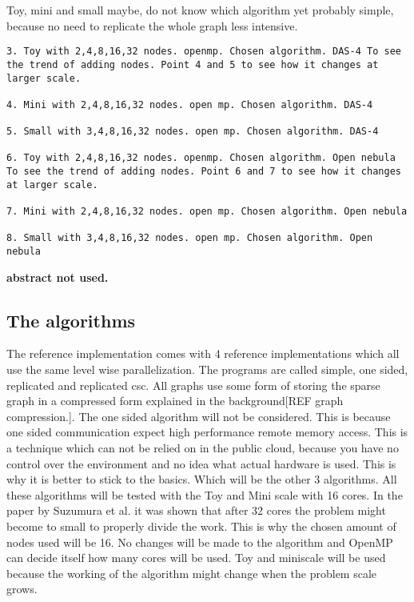 Toy, mini and small maybe, do not know which algorithm yet probably simple, because no need to replicate the whole graph less intensive.
\begin{lstlisting}
3. Toy with 2,4,8,16,32 nodes. openmp. Chosen algorithm. DAS-4 To see the trend of adding nodes. Point 4 and 5 to see how it changes at larger scale.

4. Mini with 2,4,8,16,32 nodes. open mp. Chosen algorithm. DAS-4

5. Small with 3,4,8,16,32 nodes. open mp. Chosen algorithm. DAS-4

6. Toy with 2,4,8,16,32 nodes. openmp. Chosen algorithm. Open nebula To see the trend of adding nodes. Point 6 and 7 to see how it changes at larger scale.

7. Mini with 2,4,8,16,32 nodes. open mp. Chosen algorithm. Open nebula

8. Small with 3,4,8,16,32 nodes. open mp. Chosen algorithm. Open nebula
\end{lstlisting}



\textbf{abstract not used.}

\subsection{The algorithms}
The reference implementation comes with 4 reference implementations which all use the same level wise parallelization. The programs are  called simple, one sided, replicated and replicated csc. All graphs use some form of storing the sparse graph in a compressed form explained in the background[REF graph compression.]. The one sided algorithm will not be considered. This is because one sided communication expect high performance remote memory access. This is a technique which can not be relied on in the public cloud, because you have no control over the environment and no idea what actual hardware is used. This is why it is better to stick to the basics. Which will be the other 3 algorithms.
All these algorithms will be tested with the Toy and Mini scale with 16 cores. In the paper by Suzumura et al. \cite{suzumura2011performance} it was shown that after 32 cores the problem might become to small to properly divide the work. This is why the chosen amount of nodes used will be 16. No changes will be made to the algorithm and OpenMP can decide itself how many cores will be used. Toy and miniscale will be used because the working of the algorithm might change when the problem scale grows.


